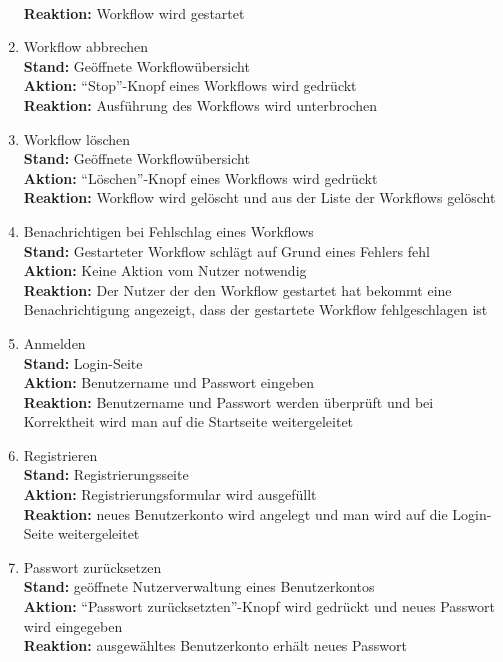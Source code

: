 \begin{enumerate}
    \\ \textbf{Reaktion:} Workflow wird gestartet
    \item Workflow abbrechen
    \\ \textbf{Stand:} Geöffnete Workflowübersicht
    \\ \textbf{Aktion:} \enquote{Stop}-Knopf eines Workflows wird gedrückt
    \\ \textbf{Reaktion:} Ausführung des Workflows wird unterbrochen
    \item Workflow löschen
    \\ \textbf{Stand:} Geöffnete Workflowübersicht
    \\ \textbf{Aktion:} \enquote{Löschen}-Knopf eines Workflows wird gedrückt
    \\ \textbf{Reaktion:} Workflow wird gelöscht und aus der Liste der Workflows gelöscht
    \item Benachrichtigen bei Fehlschlag eines Workflows
    \\ \textbf{Stand:} Gestarteter Workflow schlägt auf Grund eines Fehlers fehl
    \\ \textbf{Aktion:} Keine Aktion vom \gls{Nutzer} notwendig
    \\ \textbf{Reaktion:} Der \gls{Nutzer} der den Workflow gestartet hat bekommt eine Benachrichtigung angezeigt, dass der gestartete Workflow fehlgeschlagen ist
    \item Anmelden
    \\ \textbf{Stand:} Login-Seite
    \\ \textbf{Aktion:} Benutzername und Passwort eingeben
    \\ \textbf{Reaktion:} Benutzername und Passwort werden überprüft und bei Korrektheit wird man auf die Startseite weitergeleitet
    \item Registrieren
    \\ \textbf{Stand:} Registrierungsseite
    \\ \textbf{Aktion:} Registrierungsformular wird ausgefüllt
    \\ \textbf{Reaktion:} neues Benutzerkonto wird angelegt und man wird auf die Login-Seite weitergeleitet
    \item Passwort zurücksetzen
    \\ \textbf{Stand:} geöffnete Nutzerverwaltung eines Benutzerkontos
    \\ \textbf{Aktion:} \enquote{Passwort zurücksetzten}-Knopf wird gedrückt und neues Passwort wird eingegeben
    \\ \textbf{Reaktion:} ausgewähltes Benutzerkonto erhält neues Passwort

\end{enumerate}
